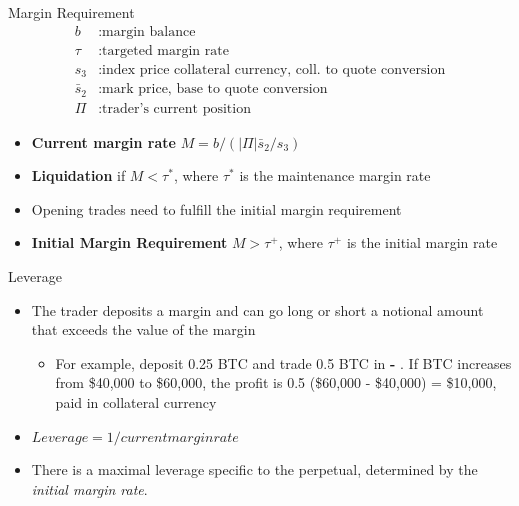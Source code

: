 \documentclass[10pt,a4paper]{article}
\begin{document}
\begin{multicols}{3}
\begin{textbox}{Margin Requirement}
    \begin{align}
 b &: \text{margin balance}\\
 \tau   &: \text{targeted margin rate}\\
 s_3 &: \text{index price collateral currency, coll.\ to quote conversion}\\
 \bar{s}_2 &: \text{mark price, base to quote conversion}\\
 \Pi   &: \text{trader's current position}
\end{align}
\begin{itemize}
    \item \textbf{Current margin rate} $M = b/(|\Pi| \bar{s}_2/s_3)$\\
    \item \textbf{Liquidation} if $M < \tau^*$, where $\tau^*$ is the maintenance margin rate\\
    \item Opening trades need to fulfill the initial margin requirement
    \item \textbf{Initial Margin Requirement} $M > \tau^+$, where $\tau^+$ is the initial margin rate\\
\end{itemize}
\end{textbox}


\begin{textbox}{Leverage}
\begin{itemize}
    \item The trader deposits a margin and can go long or short a notional
    amount that exceeds the value of the margin 
    \begin{itemize}
        \item For example, deposit 0.25 BTC
        and trade 0.5 BTC in \textbf{\color{red}{BTC}\color{mygreen}{USD} - \color{blue}{BTC}}. 
        If BTC increases from \$40,000 to \$60,000, the profit is 0.5 (\$60,000 - \$40,000) =
        \$10,000, paid in collateral currency
    \end{itemize}
    \item $Leverage = 1/ current margin rate$
    \item There is a maximal leverage specific to the perpetual, determined by the
        \emph{initial margin rate}.
\end{itemize}
\end{textbox}




\AtNextBibliography{\footnotesize}
\printbibliography  
\end{multicols}
\end{document}
